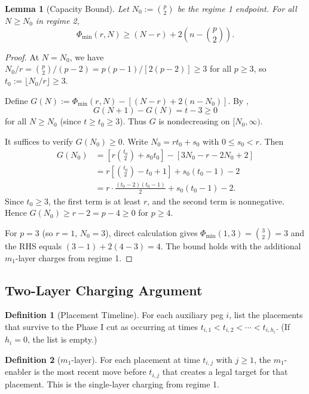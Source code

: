\documentclass[11pt]{article}
\newtheorem{lemma}[theorem]{Lemma}
\theoremstyle{definition}
\newtheorem{definition}{Definition}
\begin{document}
\begin{lemma}[Capacity Bound]\label{lem:capacity-bound}
Let $N_0 := \binom{p}{2}$ be the regime 1 endpoint. For all $N \geq N_0$ in regime 2,
\[
\Phi_{\min}(r,N) \geq (N-r) + 2\left(n - \binom{p}{2}\right).
\]
\end{lemma}

\begin{proof}
At $N = N_0$, we have $N_0/r = \binom{p}{2}/(p-2) = p(p-1)/[2(p-2)] \geq 3$ for all $p \geq 3$, so $t_0 := \lfloor N_0/r \rfloor \geq 3$.

Define $G(N) := \Phi_{\min}(r,N) - [(N-r) + 2(n-N_0)]$. By ,
\[
G(N+1) - G(N) = t - 3 \geq 0
\]
for all $N \geq N_0$ (since $t \geq t_0 \geq 3$). Thus $G$ is nondecreasing on $[N_0, \infty)$.

It suffices to verify $G(N_0) \geq 0$. Write $N_0 = rt_0 + s_0$ with $0 \leq s_0 < r$. Then
\begin{align*}
G(N_0) &= \left[r\binom{t_0}{2} + s_0 t_0\right] - \left[3N_0 - r - 2N_0 + 2\right] \\
&= r\left[\binom{t_0}{2} - t_0 + 1\right] + s_0(t_0 - 1) - 2 \\
&= r \cdot \frac{(t_0-2)(t_0-1)}{2} + s_0(t_0-1) - 2.
\end{align*}
Since $t_0 \geq 3$, the first term is at least $r$, and the second term is nonnegative. Hence $G(N_0) \geq r - 2 = p - 4 \geq 0$ for $p \geq 4$.

For $p=3$ (so $r=1$, $N_0=3$), direct calculation gives $\Phi_{\min}(1,3) = \binom{3}{2} = 3$ and the RHS equals $(3-1) + 2(4-3) = 4$. The bound holds with the additional $m_1$-layer charges from regime 1.
\end{proof}

\subsection{Two-Layer Charging Argument}

\begin{definition}[Placement Timeline]
For each auxiliary peg $i$, list the placements that survive to the Phase I cut as occurring at times $t_{i,1} < t_{i,2} < \cdots < t_{i,h_i}$. (If $h_i = 0$, the list is empty.)
\end{definition}

\begin{definition}[$m_1$-layer]
For each placement at time $t_{i,j}$ with $j \geq 1$, the $m_1$-enabler is the most recent move before $t_{i,j}$ that creates a legal target for that placement. This is the single-layer charging from regime 1.
\end{definition}
\end{document}
